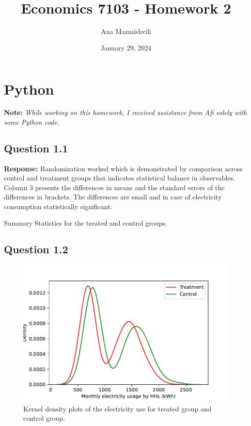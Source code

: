 \documentclass{article}
\title{Economics 7103 - Homework 2}
\author{Ana Mazmishvili}
\date{ January 29, 2024 }
\begin{document}
  
\maketitle 

\section*{Python}
\textbf{Note:} \textit{ While working on this homework, I received assistance from Afi solely with some Python code.}

\subsection*{Question 1.1}
\textbf{Response:} Randomization worked which is demonstrated by comparison across control and treatment groups that indicates statistical balance in observables. Column 3 presents the differences in means and the standard errors of the differences in brackets. The differences are small and in case of electricity consumption statistically significant.

\begin{table}[hbt!]
    \centering
    
    \caption{Summary Statistics for the treated and control groups.}
    \label{tab:my_label}
\end{table}


\subsection*{Question 1.2}

\begin{figure}[hbt!]
    \centering
    \includegraphics[scale = 0.7]{homework 2/output/figure/densityplotpy.pdf}
    \caption{Kernel density plots of the electricity use for treated group and control group.}
    \label{fig:hist}
\end{figure}
\end{document}
